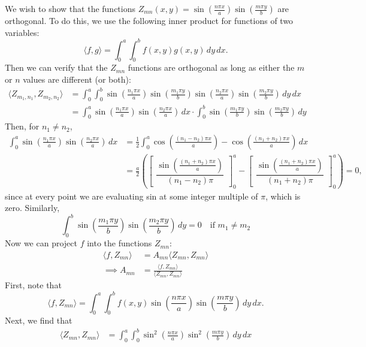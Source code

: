 \begin{enumerate}
	We wish to show that the functions $Z_{mn}(x,y) = \sin\left(\frac{n\pi x}{a}\right) \sin\left(\frac{m\pi y}{b}\right)$ are orthogonal. To do this, we use the following inner product for functions of two variables:
	\[
	\langle f, g \rangle = \int_0^a \int_0^b f(x,y)g(x,y) \,dy\,dx.
	\]
	Then we can verify that the $Z_{mn}$ functions are orthogonal as long as either the $m$ or $n$ values are different (or both):
	\begin{align*}
		\langle Z_{m_1,n_1}, Z_{m_2,n_2} \rangle &= \int_0^a \int_0^b \sin\left(\frac{n_1\pi x}{a}\right) \sin\left(\frac{m_1\pi y}{b}\right) \sin\left(\frac{n_2\pi x}{a}\right) \sin\left(\frac{m_2\pi y}{b}\right) \,dy\,dx \\ 
		&= \int_0^a \sin\left(\frac{n_1\pi x}{a}\right) \sin\left(\frac{n_2\pi x}{a}\right) \,dx \cdot \int_0^b \sin\left(\frac{m_1\pi y}{b}\right) \sin\left(\frac{m_2\pi y}{b}\right) \,dy
	\end{align*}
	Then, for $n_1 \neq n_2$,
	\begin{align*}
		\int_0^a \sin\left(\frac{n_1\pi x}{a}\right) \sin\left(\frac{n_2\pi x}{a}\right) \,dx &= \frac{1}{2} \int_0^a \cos\left(\frac{(n_1-n_2) \pi x}{a}\right) - \cos\left(\frac{(n_1+n_2) \pi x}{a}\right) \,dx \\
		&= \frac{a}{2} \left( \begin{bmatrix} \dfrac{\sin{\left(\frac{(n_1+n_2) \pi x}{a}\right)} }{(n_1-n_2) \pi} \end{bmatrix}_0^a - \begin{bmatrix} \dfrac{\sin{\left(\frac{(n_1+n_2) \pi x}{a}\right)} }{(n_1+n_2) \pi} \end{bmatrix}_0^a \right) = 0,
	\end{align*}
	since at every point we are evaluating sin at some integer multiple of $\pi$, which is zero. Similarly,
	\[
	\int_0^b \sin\left(\frac{m_1\pi y}{b}\right) \sin\left(\frac{m_2\pi y}{b}\right) \,dy = 0 \quad \text{if } m_1 \neq m_2
	\]
	Now we can project $f$ into the functions $Z_{mn}$:
	\begin{align*}
		\langle f, Z_{mn} \rangle &= A_{mn} \langle Z_{mn}, Z_{mn} \rangle \\
		\implies A_{mn} &= \frac{\langle f, Z_{mn} \rangle}{\langle Z_{mn}, Z_{mn} \rangle}
	\end{align*}
	First, note that
	\[
	\langle f, Z_{mn} \rangle = \int_0^a \int_0^b f(x,y) \sin\left(\frac{n\pi x}{a}\right) \sin\left(\frac{m\pi y}{b}\right) \,dy\,dx.
	\]
	Next, we find that
	\begin{align*}
		\langle Z_{mn}, Z_{mn} \rangle &= \int_0^a \int_0^b \sin^2\left(\frac{n\pi x}{a}\right) \sin^2\left(\frac{m\pi y}{b}\right) \,dy\,dx \\

\end{align*}
\end{enumerate}
